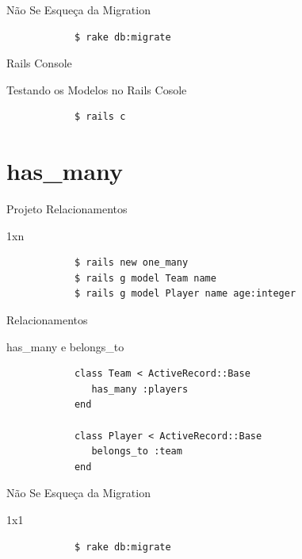\documentclass{beamer}
\begin{document}
\begin{frame}[fragile]{Não Se Esqueça da Migration}
	\begin{block} {
	}
		\begin{verbatim}
		  	$ rake db:migrate
		\end{verbatim}
	\end{block}
\end{frame}

\begin{frame}[fragile]{Rails Console}
	\begin{block} {\LARGE Testando os Modelos no Rails Cosole}
		\begin{verbatim}
			$ rails c
		\end{verbatim}
	\end{block}
\end{frame}


\section{has\_many}
\begin{frame}[fragile]{Projeto Relacionamentos}
	\begin{block} {1xn}
		\begin{verbatim}
		  	$ rails new one_many
		  	$ rails g model Team name 
		  	$ rails g model Player name age:integer
		\end{verbatim}
	\end{block}
\end{frame}

\begin{frame}[fragile]{Relacionamentos}
	\begin{block} {\LARGE has\_many e belongs\_to}
		\begin{verbatim}
		  	class Team < ActiveRecord::Base
		  	   has_many :players
		  	end
		  	
		  	class Player < ActiveRecord::Base
		  	   belongs_to :team
		  	end
		\end{verbatim}
	\end{block}
\end{frame}

\begin{frame}[fragile]{Não Se Esqueça da Migration}
	\begin{block} {1x1}
		\begin{verbatim}
		  	$ rake db:migrate
		\end{verbatim}
	\end{block}
\end{frame}
\end{document}
